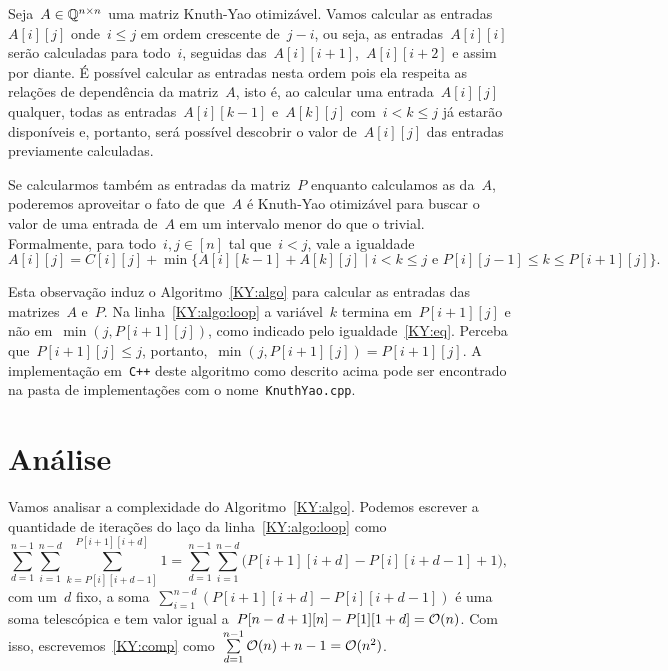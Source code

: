 Seja~$A \in \mathbb{Q}^{n \times n}$ uma matriz Knuth-Yao otimizável. Vamos calcular as entradas~$A[i][j]$ onde~$i \leq j$ em ordem crescente de~$j - i$, ou seja, as entradas~$A[i][i]$ serão calculadas para todo~$i$, seguidas das~$A[i][i+1]$,~$A[i][i+2]$ e assim por diante. É possível calcular as entradas nesta ordem pois ela respeita as relações de dependência da matriz~$A$, isto é, ao calcular uma entrada~$A[i][j]$ qualquer, todas as entradas~$A[i][k-1]$ e~$A[k][j]$ com~$i < k \leq j$ já estarão disponíveis e, portanto, será possível descobrir o valor de~$A[i][j]$ das entradas previamente calculadas.

Se calcularmos também as entradas da matriz~$P$ enquanto calculamos as da~$A$, poderemos aproveitar o fato de que~$A$ é Knuth-Yao otimizável para buscar o valor de uma entrada de~$A$ em um intervalo menor do que o trivial. Formalmente, para todo~$i,j \in [n]$ tal que~$i < j$, vale a igualdade
\begin{equation} \label{KY:eq}
A[i][j] = C[i][j] + \min\{A[i][k-1] + A[k][j] \mid i < k \leq j \text{ e } P[i][j-1] \leq k \leq P[i+1][j]\} \text{.}
\end{equation}

Esta observação induz o Algoritmo~\ref{KY:algo} para calcular as entradas das matrizes~$A$ e~$P$. Na linha~\ref{KY:algo:loop} a variável~$k$ termina em~$P[i+1][j]$ e não em~${ \min(j,P[i+1][j]) }$, como indicado pelo igualdade~\eqref{KY:eq}. Perceba que~${ P[i+1][j] \leq j }$, portanto,~${ \min(j,P[i+1][j]) = P[i+1][j] }$. A implementação em~\texttt{C++} deste algoritmo como descrito acima pode ser encontrado na pasta de implementações com o nome~\texttt{KnuthYao.cpp}.


\section{Análise}

Vamos analisar a complexidade do Algoritmo~\ref{KY:algo}. Podemos escrever a quantidade de iterações do laço da linha~\ref{KY:algo:loop} como
\begin{equation} \label{KY:comp}
{\sum\limits_{d = 1}^{n-1} \sum\limits_{i=1}^{n-d} \sum\limits_{k=P[i][i+d-1]}^{P[i+1][i+d]} 1 = \sum\limits_{d = 1}^{n-1} \sum\limits_{i=1}^{n-d} ( P[i+1][i+d] - P[i][i+d-1] + 1} ) \text{, }
\end{equation}
com um~$d$ fixo, a soma~$\sum\limits_{i=1}^{n-d} ( P[i+1][i+d] - P[i][i+d-1] )$ é uma soma telescópica e tem valor igual a~$P[n-d+1][n] - P[1][1+d] = \mathcal{O}(n)$. Com isso, escrevemos~\eqref{KY:comp} como~$\sum\limits_{d=1}^{n-1} \mathcal{O}(n) + n - 1 = \mathcal{O}(n^2)$.

